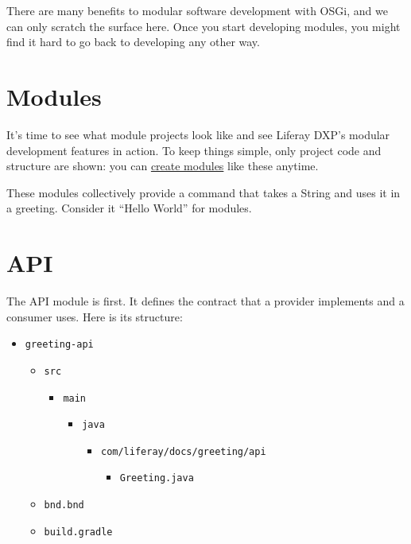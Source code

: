 There are many benefits to modular software development with OSGi, and
we can only scratch the surface here. Once you start developing modules,
you might find it hard to go back to developing any other way.

\section{Modules}\label{modules}

It's time to see what module projects look like and see Liferay DXP's
modular development features in action. To keep things simple, only
project code and structure are shown: you can
\href{/docs/7-2/reference/-/knowledge_base/r/creating-a-project}{create
modules} like these anytime.

These modules collectively provide a command that takes a String and
uses it in a greeting. Consider it ``Hello World'' for modules.

\section{API}\label{api}

The API module is first. It defines the contract that a provider
implements and a consumer uses. Here is its structure:

\begin{itemize}
\tightlist
\item
  \texttt{greeting-api}

  \begin{itemize}
  \tightlist
  \item
    \texttt{src}

    \begin{itemize}
    \tightlist
    \item
      \texttt{main}

      \begin{itemize}
      \tightlist
      \item
        \texttt{java}

        \begin{itemize}
        \tightlist
        \item
          \texttt{com/liferay/docs/greeting/api}

          \begin{itemize}
          \tightlist
          \item
            \texttt{Greeting.java}
          \end{itemize}
        \end{itemize}
      \end{itemize}
    \end{itemize}
  \item
    \texttt{bnd.bnd}
  \item
    \texttt{build.gradle}
  \end{itemize}
\end{itemize}

